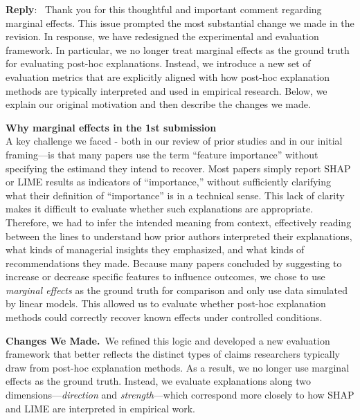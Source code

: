 \documentclass[11pt]{article}
\newcounter{se}[section]
\newenvironment{reply}
 {\par\medskip \noindent \begin{sf}\textbf{Reply}:\ }
 {\medskip \end{sf}}
\begin{document}
\begin{reply}
Thank you for this thoughtful and important comment regarding marginal effects. This issue prompted the most substantial change we made in the revision. In response, we have redesigned the experimental and evaluation framework. In particular, we no longer treat marginal effects as the ground truth for evaluating post-hoc explanations. Instead, we introduce a new set of evaluation metrics that are explicitly aligned with how post-hoc explanation methods are typically interpreted and used in empirical research. Below, we explain our original motivation and then describe the changes we made.

\noindent\textbf{Why marginal effects in the 1st submission}\\
A key challenge we faced - both in our review of prior studies and in our initial framing—is that many papers use the term “feature importance” without specifying the estimand they intend to recover. Most papers simply report SHAP or LIME results as indicators of “importance,” without sufficiently clarifying what their definition of “importance” is in a technical sense. This lack of clarity makes it difficult to evaluate whether such explanations are appropriate. Therefore, we had to infer the intended meaning from context, effectively reading between the lines to understand how prior authors interpreted their explanations, what kinds of managerial insights they emphasized, and what kinds of recommendations they made. Because many papers concluded by suggesting to increase or decrease specific features to influence outcomes, we chose to use \textit{marginal effects} as the ground truth for comparison and only use data simulated by linear models. %
This allowed us to evaluate whether post-hoc explanation methods could correctly recover known effects under controlled conditions. %

\noindent\textbf{Changes We Made.}\
We refined this logic and developed a new evaluation framework that better reflects the distinct types of claims researchers typically draw from post-hoc explanation methods. As a result, we no longer use marginal effects as the ground truth. Instead, we evaluate explanations along two dimensions—\emph{direction} and \emph{strength}—which correspond more closely to how SHAP and LIME are interpreted in empirical work.


\end{reply}
\end{document}
